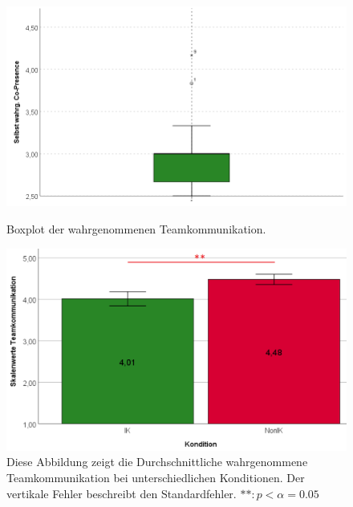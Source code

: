 \documentclass[a4paper,11pt]{article}%
\renewcommand{\\}{\vspace*{0.5\baselineskip} \newline}
\begin{document}
	\begin{figure}[H]
   \begin{minipage}[t]{.5\linewidth} %
      \includegraphics[width=\linewidth]{Abbildungen/AuswertungDiagramme/BP_SelfCoPresence.png}
      \caption[Boxplot der wahrgenommenen Teamkommunikation]{Boxplot der wahrgenommenen Teamkommunikation.}
            \label{SD_TeamkommunikationBP}
   \end{minipage}
   \hspace{.02\linewidth}%
   \begin{minipage}[t]{.5\linewidth} %
     \includegraphics[width=\linewidth]{Abbildungen/AuswertungDiagramme/SD_Teamkommunikation_Mittelwerte.png}
      \caption[Durchschnittlich wahrgenommene Teamkommunikation]{Diese Abbildung zeigt die Durchschnittliche wahrgenommene Teamkommunikation bei unterschiedlichen Konditionen. Der vertikale Fehler beschreibt den Standardfehler. $** : p < \alpha = 0.05$}
       \label{SD_Teamkommunikation_Mittelwerte}
   \end{minipage}
\end{figure}
\end{document}
